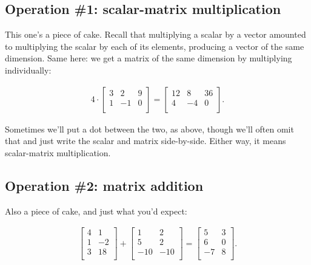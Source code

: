 \subsection{Operation \#1: scalar-matrix multiplication}
\label{scalarMatrixMultiplication}

This one's a piece of cake. Recall that multiplying a scalar by a vector
amounted to multiplying the scalar by each of its elements, producing a vector
of the same dimension. Same here: we get a matrix of the same dimension by
multiplying individually:

\vspace{-.15in}
\begin{align*}
4 \cdot
\begin{bmatrix}
3 & 2 & 9 \\
1 & -1 & 0 \\
\end{bmatrix}
=
\begin{bmatrix}
12 & 8 & 36 \\
4 & -4 & 0 \\
\end{bmatrix}.
\end{align*}
\vspace{-.15in}

Sometimes we'll put a dot between the two, as above, though we'll often omit
that and just write the scalar and matrix side-by-side. Either way, it means
scalar-matrix multiplication.

\subsection{Operation \#2: matrix addition}
\label{matrixAddition}

Also a piece of cake, and just what you'd expect:

\vspace{-.15in}
\begin{align*}
\begin{bmatrix}
4 & 1 \\
1 & -2 \\
3 & 18 \\
\end{bmatrix}
+
\begin{bmatrix}
1 & 2 \\
5 & 2 \\
-10 & -10 \\
\end{bmatrix}
=
\begin{bmatrix}
5 & 3 \\
6 & 0 \\
-7 & 8 \\
\end{bmatrix}.
\end{align*}
\vspace{-.15in}

